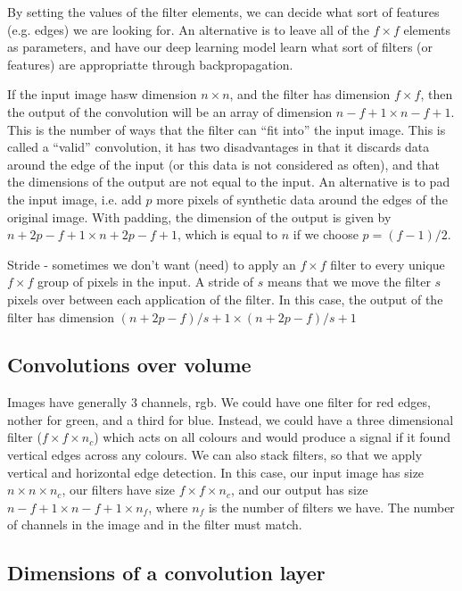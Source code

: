 \documentclass{article}
\begin{document}
By setting the values of the filter elements, we can decide what sort of features (e.g. edges) we are looking for. An alternative is to leave all of the $f \times f$ elements as parameters, and have our deep learning model learn what sort of filters (or features) are appropriatte through backpropagation.


If the input image hasw dimension $n\times n$, and the filter has dimension $f \times f$, then the output of the convolution will be an array of dimension $n - f +1 \times n - f +1$. This is the number of ways that the filter can ``fit into'' the input image. This is called a ``valid'' convolution, it has two disadvantages in that it discards data around the edge of the input (or this data is not considered as often), and that the dimensions of the output are not equal to the input. An alternative is to pad the input image, i.e. add $p$ more pixels of synthetic data around the edges of the original image. With padding, the dimension of the output is given by $ n + 2p -f +1 \times n + 2p -f +1$, which is equal to $n$ if we choose $p = (f-1)/2$. 

Stride - sometimes we don't want (need) to apply an $f \times f$ filter to every unique $f \times f$ group of pixels in the input. A stride of $s$ means that we move the filter $s$ pixels over between each application of the filter. In this case, the output of the filter has dimension $(n + 2p - f)/s + 1 \times (n + 2p - f)/s + 1$  

\subsection{Convolutions over volume}

Images have generally 3 channels, rgb. We could have one filter for red edges, nother for green, and a third for blue. Instead, we could have a three dimensional filter ($f \times f \times n_c$) which acts on all colours and would produce a signal if it found vertical edges across any colours. We can also stack filters, so that we apply vertical and horizontal edge detection. In this case, our input image has size $n \times n \times n_c$, our filters have size $f\times f \times n_c$, and our output has size $ n-f+1 \times n-f+1 \times n_f$, where $n_f$ is the number of filters we have. The number of channels in the image and in the filter must match.

\subsection{Dimensions of a convolution layer}
\end{document}
